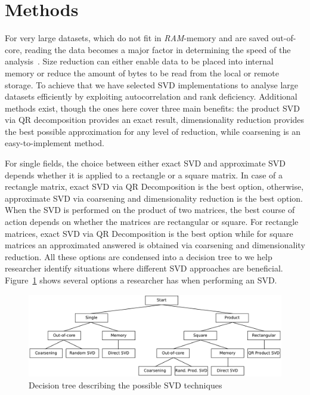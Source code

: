 \documentclass[ijgi,article,submit,moreauthors,pdftex,10pt,a4paper]{Definitions/mdpi}
\begin{document}
\section{Methods}
\label{sec:Methods}
For very large datasets, which do not fit in \textit{RAM}-memory and are saved out-of-core, reading the data becomes a major factor in determining the speed of the analysis~\cite{Halko2011}. Size reduction can either enable data to be placed into internal memory or reduce the amount of bytes to be read from the local or remote storage. To achieve that we have selected SVD implementations to analyse large datasets efficiently by exploiting autocorrelation and rank deficiency. Additional methods exist, though the ones here cover three main benefits: the product SVD via QR decomposition provides an exact result, dimensionality reduction provides the best possible approximation for any level of reduction, while coarsening is an easy-to-implement method. 

For single fields, the choice between either exact SVD and approximate SVD depends whether it is applied to a rectangle or a square matrix. In case of a rectangle matrix, exact SVD via QR Decomposition is the best option, otherwise, approximate SVD via coarsening and dimensionality reduction is the best option. When the SVD is performed on the product of two matrices, the best course of action depends on whether the matrices are rectangular or square. For rectangle matrices, exact SVD via QR Decomposition is the best option while for square matrices an approximated answered is obtained via coarsening and dimensionality reduction. All these options are condensed into a decision tree to we help researcher identify situations where different SVD approaches are beneficial. Figure~\ref{fig:FlowDiagram} shows several options a researcher has when performing an SVD. 

\begin{figure}[H]
\centering
\includegraphics[width=\textwidth]{Results/FlowDiagram.pdf}
\caption{Decision tree describing the possible SVD techniques}
\label{fig:FlowDiagram}
\end{figure}
\end{document}
